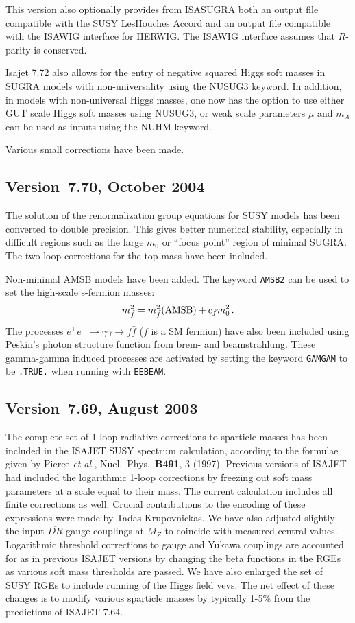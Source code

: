 This version also optionally provides from ISASUGRA both an output file
compatible with the SUSY LesHouches Accord and an output file compatible
with the ISAWIG interface for HERWIG. The ISAWIG interface assumes that
$R$-parity is conserved.

Isajet 7.72 also allows for the entry of negative squared Higgs soft
masses in SUGRA models with non-universality using the NUSUG3 keyword.
In addition, in models with non-universal Higgs masses, one now has the
option to use either GUT scale Higgs soft masses using NUSUG3, or weak
scale parameters $\mu$ and $m_A$ can be used as inputs using the NUHM
keyword.

Various small corrections have been made.

\subsection{Version~7.70, October 2004}

The solution of the renormalization group equations for SUSY models has
been converted to double precision. This gives better numerical
stability, especially in difficult regions such as the large $m_0$ or
``focus point'' region of minimal SUGRA. The two-loop corrections for
the top mass have been included.

Non-minimal AMSB models have been added. The keyword \verb|AMSB2| can be
used to set the high-scale s-fermion masses:
$$
m_{\tilde f}^2=m_{\tilde f}^2({\rm AMSB})+c_f m_0^2\,.
$$
The processes $e^+e^-\to\gamma\gamma\to f\bar{f}$ ($f$ is a SM fermion)
have also been included using Peskin's photon structure function from
brem- and beamstrahlung. These gamma-gamma induced processes are
activated by setting the keyword \verb|GAMGAM| to be \verb|.TRUE.| when
running with \verb|EEBEAM|.

\subsection{Version~7.69, August 2003}

The complete set of 1-loop radiative corrections to sparticle masses has
been included in the ISAJET SUSY spectrum calculation, according to the
formulae given by Pierce {\it et al.}, Nucl.\ Phys.\ {\bf B491}, 3
(1997).  Previous versions of ISAJET had included the logarithmic 1-loop
corrections by freezing out soft mass parameters at a scale equal to
their mass. The current calculation includes all finite corrections as
well. Crucial contributions to the encoding of these expressions were
made by Tadas Krupovnickas. We have also adjusted slightly the input
$\overline{DR}$ gauge couplings at $M_Z$ to coincide with measured
central values.  Logarithmic threshold corrections to gauge and Yukawa
couplings are accounted for as in previous ISAJET versions by changing
the beta functions in the RGEs as various soft mass thresholds are
passed. We have also enlarged the set of SUSY RGEs to include running
of the Higgs field vevs. The net effect of these changes is to modify
various sparticle masses by typically 1-5\% from the predictions of
ISAJET 7.64.

